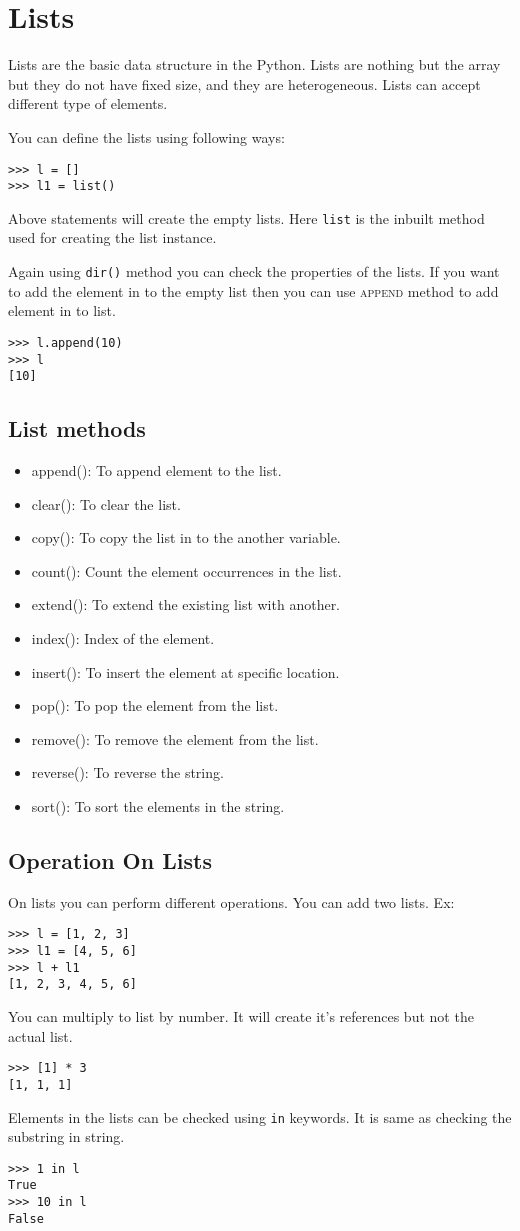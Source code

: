 \documentclass[letterpaper,12pt]{book}
\begin{document}
\section{Lists}
Lists are the basic data structure in the Python. Lists are nothing but the array but they do not have fixed size, and they are heterogeneous. Lists can accept different type of elements.

You can define the lists using following ways:
\begin{verbatim}
>>> l = []
>>> l1 = list()
\end{verbatim}
Above statements will create the empty lists. Here \texttt{list} is the inbuilt method used for creating the list instance.

Again using \texttt{dir()} method you can check the properties of the lists.
If you want to add the element in to the empty list then you can use \textsc{append} method to add element in to list.
\begin{verbatim}
>>> l.append(10)
>>> l
[10]
\end{verbatim}
\subsection{List methods}
\begin{itemize}
\item append(): To append element to the list.
\item clear(): To clear the list.
\item copy(): To copy the list in to the another variable.
\item count(): Count the element occurrences in the list.
\item extend(): To extend the existing list with another.
\item index(): Index of the element.
\item insert(): To insert the element at specific location.
\item pop(): To pop the element from the list.
\item remove(): To remove the element from the list.
\item reverse(): To reverse the string.
\item sort(): To sort the elements in the string.
\end{itemize}

\subsection{Operation On Lists}
On lists you can perform different operations. You can add two lists. Ex:
\begin{verbatim}
>>> l = [1, 2, 3]
>>> l1 = [4, 5, 6]
>>> l + l1
[1, 2, 3, 4, 5, 6]
\end{verbatim}
You can multiply to list by number. It will create it's references but not the actual list.
\begin{verbatim}
>>> [1] * 3
[1, 1, 1]
\end{verbatim}
Elements in the lists can be checked using \texttt{in} keywords. It is same as checking the substring in string.
\begin{verbatim}
>>> 1 in l
True
>>> 10 in l
False
\end{verbatim}
\end{document}
